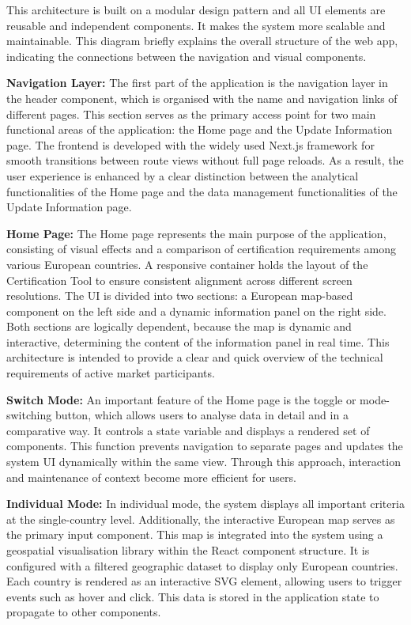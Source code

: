This architecture is built on a modular design pattern and all UI elements are reusable and independent components. It makes the system more scalable and maintainable. This diagram briefly explains the overall structure of the web app, indicating the connections between the navigation and visual components.

\textbf{Navigation Layer:} The first part of the application is the navigation layer in the header component, which is organised with the name and navigation links of different pages. This section serves as the primary access point for two main functional areas of the application: the Home page and the Update Information page. The frontend is developed with the widely used Next.js framework for smooth transitions between route views without full page reloads. As a result, the user experience is enhanced by a clear distinction between the analytical functionalities of the Home page and the data management functionalities of the Update Information page.

\textbf{Home Page:} The Home page represents the main purpose of the application, consisting of visual effects and a comparison of certification requirements among various European countries. A responsive container holds the layout of the Certification Tool to ensure consistent alignment across different screen resolutions. The UI is divided into two sections: a European map-based component on the left side and a dynamic information panel on the right side. Both sections are logically dependent, because the map is dynamic and interactive, determining the content of the information panel in real time. This architecture is intended to provide a clear and quick overview of the technical requirements of active market participants.

\textbf{Switch Mode:} An important feature of the Home page is the toggle or mode-switching button, which allows users to analyse data in detail and in a comparative way. It controls a state variable and displays a rendered set of components. This function prevents navigation to separate pages and updates the system UI dynamically within the same view. Through this approach, interaction and maintenance of context become more efficient for users.

\textbf{Individual Mode:} In individual mode, the system displays all important criteria at the single-country level. Additionally, the interactive European map serves as the primary input component. This map is integrated into the system using a geospatial visualisation library within the React component structure. It is configured with a filtered geographic dataset to display only European countries. Each country is rendered as an interactive SVG element, allowing users to trigger events such as hover and click. This data is stored in the application state to propagate to other components.

